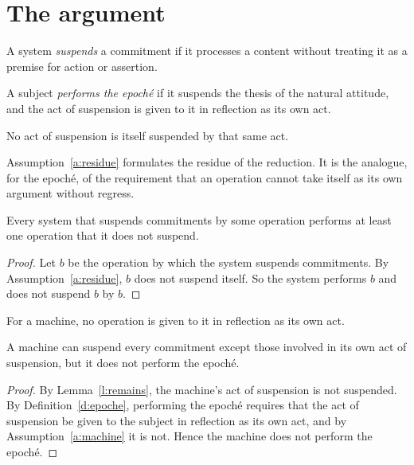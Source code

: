 \documentclass{situationist-preprint}
\begin{document}
\section{The argument}

\begin{definition}\label{d:suspend}
A system \emph{suspends} a commitment if it processes a content without treating it as a premise for action or assertion.
\end{definition}

\begin{definition}\label{d:epoche}
A subject \emph{performs the epoché} if it suspends the thesis of the natural attitude, and the act of suspension is given to it in reflection as its own act.
\end{definition}

\begin{assumption}\label{a:residue}
No act of suspension is itself suspended by that same act.
\end{assumption}

Assumption~\ref{a:residue} formulates the residue of the reduction. It is the analogue, for the epoché, of the requirement that an operation cannot take itself as its own argument without regress.

\begin{lemma}\label{l:remains}
Every system that suspends commitments by some operation performs at least one operation that it does not suspend.
\end{lemma}

\begin{proof}
Let $b$ be the operation by which the system suspends commitments. By Assumption~\ref{a:residue}, $b$ does not suspend itself. So the system performs $b$ and does not suspend $b$ by $b$.
\end{proof}

\begin{assumption}\label{a:machine}
For a machine, no operation is given to it in reflection as its own act.
\end{assumption}

\begin{theorem}\label{t:main}
A machine can suspend every commitment except those involved in its own act of suspension, but it does not perform the epoché.
\end{theorem}

\begin{proof}
By Lemma~\ref{l:remains}, the machine's act of suspension is not suspended. By Definition~\ref{d:epoche}, performing the epoché requires that the act of suspension be given to the subject in reflection as its own act, and by Assumption~\ref{a:machine} it is not. Hence the machine does not perform the epoché.
\end{proof}
\end{document}
